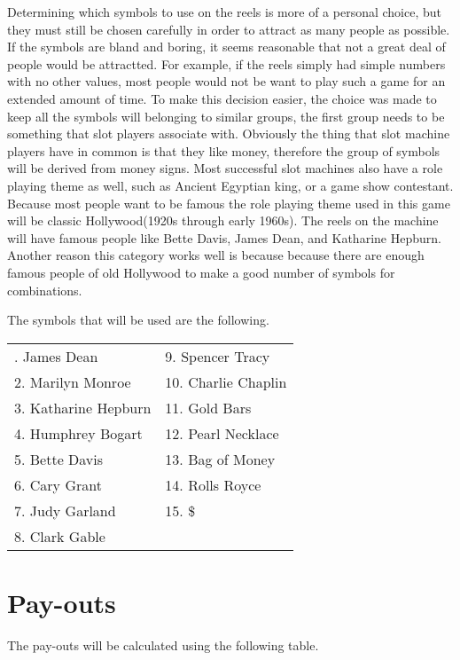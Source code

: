 Determining which symbols to use on the reels is more of a personal choice, but they must still be chosen carefully in order to attract as many people as possible.  If the symbols are bland and boring, it seems reasonable that not a great deal of people would be attractted.  For example, if the reels simply had simple numbers with no other values, most people would not be want to play such a game for an extended amount of time.  To make this decision easier, the choice was made to keep all the symbols will belonging to similar groups, the first group needs to be something that slot players associate with.  Obviously the thing that slot machine players have in common is that they like money, therefore the group of symbols will be derived from money signs.  Most successful slot machines also have a role playing theme as well, such as Ancient Egyptian king, or a game show contestant.  Because most people want to be famous the role playing theme used in this game will be classic Hollywood(1920s through early 1960s).  The reels on the machine will have famous people like Bette Davis, James Dean, and Katharine Hepburn.  Another reason this category works well is because because there are enough famous people of old Hollywood to make a good number of symbols for combinations.

The symbols that will be used are the following.

\begin{center}
\begin{tabular}{ l l }
  \centering
   1. James Dean &         9. Spencer Tracy \\ 
   2. Marilyn Monroe &     10. Charlie Chaplin \\ 
   3. Katharine Hepburn &  11. Gold Bars \\    
   4. Humphrey Bogart &    12. Pearl Necklace \\
   5. Bette Davis &        13. Bag of Money \\
   6. Cary Grant &         14. Rolls Royce \\
   7. Judy Garland &       15. \$ \\
   8. Clark Gable &
\end{tabular}
\end{center}

\section{Pay-outs}

The pay-outs will be calculated using the following table.


